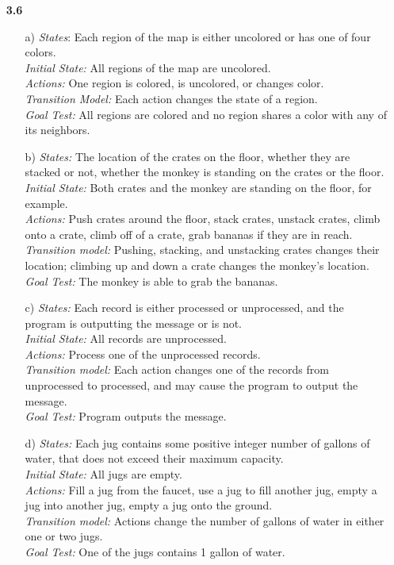 \documentclass{article}
\begin{document}
\begin{enumerate}
\item[\textbf{3.6}]
\begin{enumerate}
\item[a)]
\emph{States}: Each region of the map is either uncolored or has one of four colors.\\
\emph{Initial State:} All regions of the map are uncolored.\\
\emph{Actions:} One region is colored, is uncolored, or changes color.\\
\emph{Transition Model:} Each action changes the state of a region.\\
\emph{Goal Test:} All regions are colored and no region shares a color with any of its neighbors.\\
\item[b)]
\emph{States:} The location of the crates on the floor, whether they are stacked or not, whether the monkey
is standing on the crates or the floor.\\
\emph{Initial State:} Both crates and the monkey are standing on the floor, for example.\\
\emph{Actions:} Push crates around the floor, stack crates, unstack crates, climb onto a crate, climb off of a crate,
grab bananas if they are in reach.\\
\emph{Transition model:} Pushing, stacking, and unstacking crates changes their location; climbing up and down a
crate changes the monkey's location.\\
\emph{Goal Test:} The monkey is able to grab the bananas.\\
\item[c)]
\emph{States:} Each record is either processed or unprocessed, and the program is outputting the message or is not.\\
\emph{Initial State:} All records are unprocessed.\\
\emph{Actions:} Process one of the unprocessed records.\\
\emph{Transition model:} Each action changes one of the records from unprocessed to processed, and may cause the
program to output the message.\\
\emph{Goal Test:} Program outputs the message.\\
\item[d)]
\emph{States:} Each jug contains some positive integer number of gallons of water, that does not exceed their maximum
capacity.\\
\emph{Initial State:} All jugs are empty.\\
\emph{Actions:} Fill a jug from the faucet, use a jug to fill another jug, empty a jug into another jug, empty a jug onto the ground.\\
\emph{Transition model:} Actions change the number of gallons of water in either one or two jugs.\\
\emph{Goal Test:} One of the jugs contains 1 gallon of water.\\
\end{enumerate}


\end{enumerate}
\end{document}
